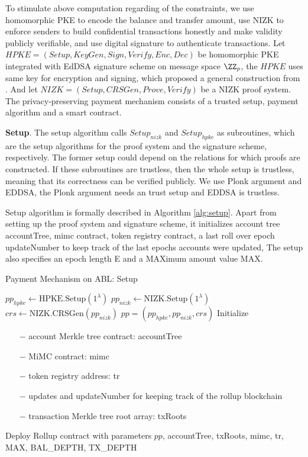 \documentclass{article}
\begin{document}
To stimulate above computation regarding of the constraints, we use homomorphic PKE to encode the balance and transfer amount, use NIZK to enforce senders to build confidential transactions honestly and make validity publicly verifiable, and use digital signature to authenticate transactions. Let $HPKE = (Setup, KeyGen, Sign, Verify, Enc, Dec)$ be homomorphic PKE integrated with EdDSA signature scheme on message space $\ZZ_p$, the $HPKE$ uses same key for encryption and signing, which proposed a general construction from \cite{paterson2011joint}. And let $NIZK = (Setup, CRSGen, Prove, Verify)$ be a NIZK proof system. The privacy-preserving payment mechanism consists of a trusted setup, payment algorithm and a smart contract.

\textbf{Setup}. The setup algorithm calls $Setup_{nizk}$ and $Setup_{hpke}$ as subroutines, which are the setup algorithms for the proof system and the signature scheme, respectively. The former setup could depend on the relations for which proofs are constructed. If these subroutines are trustless, then the whole setup is trustless, meaning that its correctness can be verified publicly. We use Plonk argument and EDDSA, the Plonk argument needs an trust setup and EDDSA is trustless.

Setup algorithm is formally described in Algorithm \ref{alg:setup}. Apart from setting up the proof system and signature scheme, it initializes account tree accountTree, mimc contract, token registry contract, a last roll over epoch updateNumber to keep track of the last epochs accounts were updated, The setup also specifies an epoch length E and a \mbox{MAX}imum amount value \mbox{MAX}.

\begin{algorithm}
 \caption{Payment Mechanism on ABL: Setup}
    \label{alg:setup}
    \LinesNumbered
    
    $pp_{hpke} \gets \mbox{HPKE.Setup}(1^\lambda)$ \;
    $pp_{nizk} \gets \mbox{NIZK.Setup}(1^\lambda)$ \;
    $crs \gets \mbox{NIZK.CRSGen}(pp_{nizk})$ \;
    $pp = (pp_{hpke}, pp_{nizk}, crs)$ \;
    Initialize {
        \begin{itemize}
            \item[$-$] account Merkle tree contract: accountTree
            \item[$-$] MiMC contract: mimc
            \item[$-$] token registry address: tr
            \item[$-$] updates and updateNumber for keeping track of the rollup blockchain
            \item[$-$] transaction Merkle tree root array: txRoots
        \end{itemize}
    }
    Deploy Rollup contract with parameters $pp$, accountTree, txRoots, mimc, tr, \mbox{MAX}, BAL\_DEPTH, TX\_DEPTH
    
\end{algorithm}
\end{document}
